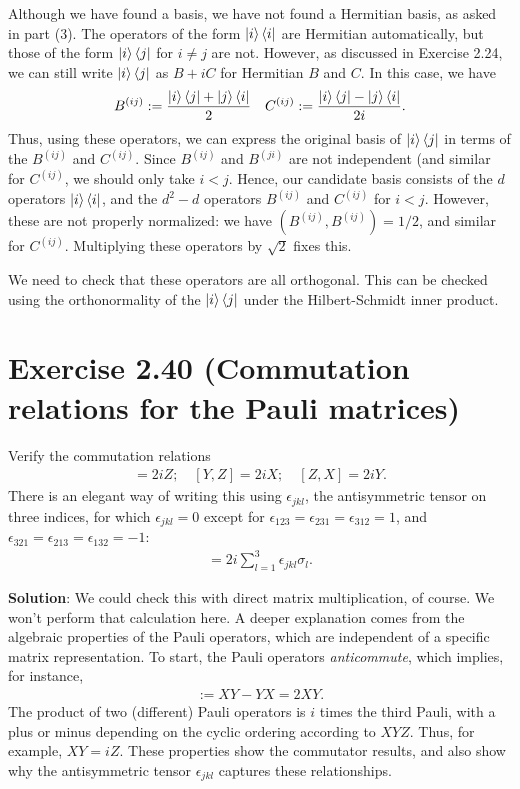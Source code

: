 \documentclass{book}
\begin{document}
    Although we have found a basis, we have not found a Hermitian basis, as asked in part (3). The operators of the form $\ket{i}\bra{i}$ are Hermitian automatically, but those of the form $\ket{i}\bra{j}$ for $i\neq j$ are not. However, as discussed in Exercise 2.24, we can still write $\ket{i}\bra{j}$ as $B + iC$ for Hermitian $B$ and $C$. In this case, we have
    \begin{align} \label{eq:B_C_Hermitian}
        B^{(ij)} := \frac{\ket{i}\bra{j}+\ket{j}\bra{i}}{2} \quad  C^{(ij)} := \frac{\ket{i}\bra{j}-\ket{j}\bra{i}}{2i}.
    \end{align}
    Thus, using these operators, we can express the original basis of $\ket{i}\bra{j}$ in terms of the $B^{(ij)}$ and $C^{(ij)}$. Since $B^{(ij)}$ and $B^{(ji)}$ are not independent (and similar for $C^{(ij)}$, we should only take $i <j$. Hence, our candidate basis consists of the $d$ operators $\ket{i}\bra{i}$, and the $d^2 - d$ operators $B^{(ij)}$ and $C^{(ij)}$ for $i < j$. However, these are not properly normalized: we have $(B^{(ij)}, B^{(ij)}) = 1/2$, and similar for $C^{(ij)}$. Multiplying these operators by $\sqrt{2}$ fixes this.
    
    We need to check that these operators are all orthogonal. This can be checked using the orthonormality of the $\ket{i}\bra{j}$ under the Hilbert-Schmidt inner product. 
    
\section*{Exercise 2.40 (Commutation relations for the Pauli matrices)}
    Verify the commutation relations
    \begin{align}
        [X, Y] = 2iZ; \quad [Y, Z] = 2iX; \quad [Z, X] = 2iY.
    \end{align}
    There is an elegant way of writing this using $\epsilon_{jkl}$, the antisymmetric tensor on three indices, for which $\epsilon_{jkl} = 0$ except for $\epsilon_{123} = \epsilon_{231} = \epsilon_{312} = 1$, and $\epsilon_{321} = \epsilon_{213} = \epsilon_{132} = -1$:
    \begin{align}
        [\sigma_j, \sigma_k] = 2i \sum_{l=1}^3 \epsilon_{jkl} \sigma_l.
    \end{align}
    
    \textbf{Solution}: We could check this with direct matrix multiplication, of course. We won't perform that calculation here. A deeper explanation comes from the algebraic properties of the Pauli operators, which are independent of a specific matrix representation. To start, the Pauli operators \emph{anticommute}, which implies, for instance,
    \begin{align}
        [X,Y] := XY-YX = 2 XY.
    \end{align}
    The product of two (different) Pauli operators is $i$ times the third Pauli, with a plus or minus depending on the cyclic ordering according to $XYZ$. Thus, for example, $XY = iZ$. These properties show the commutator results, and also show why the antisymmetric tensor $\epsilon_{jkl}$ captures these relationships. 
    
\end{document}
